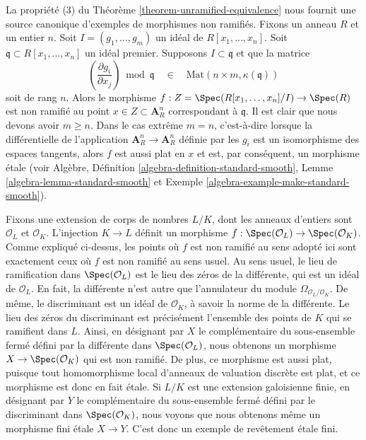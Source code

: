 \begin{example}
\label{example-standard-etale}
La propriété (3) du
Théorème \ref{theorem-unramified-equivalence}
nous fournit une source canonique d'exemples de morphismes non ramifiés.
Fixons un anneau $R$ et un entier $n$. Soit $I = (g_1, \ldots, g_m)$ un
idéal de $R[x_1, \ldots, x_n]$. Soit $\mathfrak q \subset R[x_1, \ldots, x_n]$
un idéal premier. Supposons $I \subset \mathfrak q$ et que la matrice
$$
\left(\frac{\partial g_i}{\partial x_j}\right) \bmod \mathfrak q
\quad\in\quad
\text{Mat}(n \times m, \kappa(\mathfrak q))
$$
soit de rang $n$. Alors le morphisme
$f : Z = \Spec(R[x_1, \ldots, x_n]/I) \to \Spec(R)$
est non ramifié au point $x \in Z \subset \mathbf{A}^n_R$ correspondant
à $\mathfrak q$. Il est clair que nous devons avoir $m \geq n$.
Dans le cas extrême $m = n$, c'est-à-dire lorsque la différentielle de l'application
$\mathbf{A}^n_R \to \mathbf{A}^n_R$ définie par les $g_i$
est un isomorphisme des espaces tangents, alors $f$ est aussi plat
en $x$ et est, par conséquent, un morphisme \'etale (voir Algèbre,
Définition \ref{algebra-definition-standard-smooth},
Lemme \ref{algebra-lemma-standard-smooth} et
Exemple \ref{algebra-example-make-standard-smooth}).
\end{example}

\begin{example}
\label{example-number-theory-etale}
Fixons une extension de corps de nombres $L/K$, dont les anneaux d'entiers sont
$\mathcal{O}_L$ et $\mathcal{O}_K$. L'injection $K \to L$ définit un
morphisme $f : \Spec(\mathcal{O}_L) \to \Spec(\mathcal{O}_K)$.
Comme expliqué ci-dessus, les points où $f$ est non ramifié au sens adopté ici
sont exactement ceux où $f$ est non ramifié au sens
usuel. Au sens usuel, le lieu de ramification dans
$\Spec(\mathcal{O}_L)$ est le lieu des zéros de la
différente, qui est un idéal de $\mathcal{O}_L$. En fait, la différente
n'est autre que l'annulateur du module
$\Omega_{\mathcal{O}_L/\mathcal{O}_K}$. De même, le
discriminant est un idéal de $\mathcal{O}_K$, à savoir la
norme de la différente.
Le lieu des zéros du discriminant est précisément l'ensemble
des points de $K$ qui se ramifient dans $L$.
Ainsi, en désignant par $X$ le complémentaire du sous-ensemble fermé
défini par la différente dans $\Spec(\mathcal{O}_L)$,
nous obtenons un morphisme $X \to \Spec(\mathcal{O}_K)$ qui est non ramifié.
De plus, ce morphisme est aussi plat, puisque tout homomorphisme local
d'anneaux de valuation discrète est plat, et ce morphisme est donc
en fait \'etale. Si $L/K$ est une extension galoisienne finie, en désignant par
$Y$ le complémentaire du sous-ensemble fermé défini par le discriminant dans
$\Spec(\mathcal{O}_K)$, nous voyons que nous obtenons même un
morphisme fini \'etale $X \to Y$.
C'est donc un exemple de revêtement \'etale fini.
\end{example}





